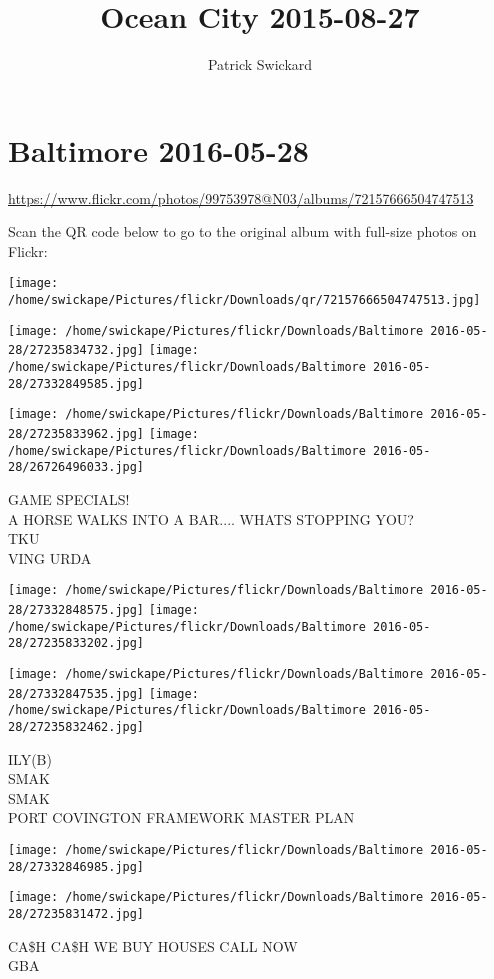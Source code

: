 \documentclass[10pt,letterpaper]{article}
\title{Ocean City 2015-08-27}
\author{Patrick Swickard}
\date{}
\begin{document}
\section*{Baltimore 2016-05-28}

\url{https://www.flickr.com/photos/99753978@N03/albums/72157666504747513}

Scan the QR code below to go to the original album with full-size photos on Flickr:

\texttt{[image: /home/swickape/Pictures/flickr/Downloads/qr/72157666504747513.jpg]}
\pagebreak

\texttt{[image: /home/swickape/Pictures/flickr/Downloads/Baltimore 2016-05-28/27235834732.jpg]}
\texttt{[image: /home/swickape/Pictures/flickr/Downloads/Baltimore 2016-05-28/27332849585.jpg]}

\texttt{[image: /home/swickape/Pictures/flickr/Downloads/Baltimore 2016-05-28/27235833962.jpg]}
\texttt{[image: /home/swickape/Pictures/flickr/Downloads/Baltimore 2016-05-28/26726496033.jpg]}

GAME SPECIALS!\\
A HORSE WALKS INTO A BAR.... WHATS STOPPING YOU?\\
TKU\\
VING URDA
\pagebreak

\texttt{[image: /home/swickape/Pictures/flickr/Downloads/Baltimore 2016-05-28/27332848575.jpg]}
\texttt{[image: /home/swickape/Pictures/flickr/Downloads/Baltimore 2016-05-28/27235833202.jpg]}

\texttt{[image: /home/swickape/Pictures/flickr/Downloads/Baltimore 2016-05-28/27332847535.jpg]}
\texttt{[image: /home/swickape/Pictures/flickr/Downloads/Baltimore 2016-05-28/27235832462.jpg]}

ILY(B)\\
SMAK\\
SMAK\\
PORT COVINGTON FRAMEWORK MASTER PLAN
\pagebreak

\texttt{[image: /home/swickape/Pictures/flickr/Downloads/Baltimore 2016-05-28/27332846985.jpg]}

\vspace{0.25in}
\texttt{[image: /home/swickape/Pictures/flickr/Downloads/Baltimore 2016-05-28/27235831472.jpg]}

CA\$H CA\$H WE BUY HOUSES CALL NOW\\
GBA
\pagebreak
\end{document}

